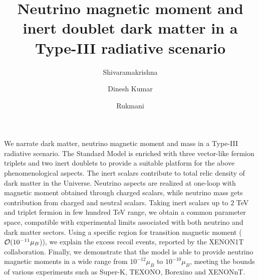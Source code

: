 \documentclass[aps, a4paper,superscriptaddress,12pt,preprintnumbers,floatfix,nofootinbib,amsmath,amssymb]{revtex4}
\begin{document}
\title{\hspace*{-1.0cm} Neutrino magnetic moment and inert doublet dark matter in a Type-III radiative scenario} 
\author{Shivaramakrishna }
\author{Dinesh Kumar }
\author{Rukmani }

\begin{abstract}
\vspace*{1cm}

  
\end{abstract}
\maketitle
We narrate dark matter, neutrino magnetic moment and mass in a Type-III radiative scenario. The Standard Model is enriched with three vector-like fermion triplets and two inert doublets to provide a suitable platform for the above phenomenological aspects.  The inert scalars contribute to total relic density of dark matter in the Universe. Neutrino aspects are realized at one-loop with magnetic moment obtained through charged scalars, while neutrino mass gets contribution from charged and neutral scalars. Taking inert scalars up to $2$ TeV and triplet fermion in few hundred TeV range, we obtain a common parameter space, compatible with experimental limits associated with both neutrino and dark matter sectors. Using a specific region for transition magnetic moment (${\cal O} (10^{-11}\mu_B$)), we explain the excess recoil events, reported by the XENON1T collaboration. Finally, we demonstrate that the model is able to provide neutrino magnetic moments in a wide range from $10^{-12}\mu_B$ to $10^{-10}\mu_B$, meeting the bounds of various experiments such as Super-K, TEXONO, Borexino and XENONnT.
\newpage
\end{document}

